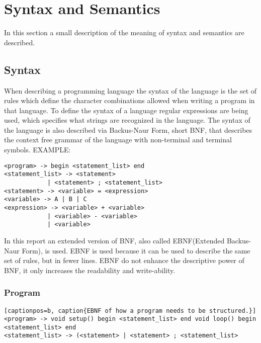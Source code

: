 \chapter{Syntax and Semantics}\label{analysis:syntax-and-semantics}
In this section a small description of the meaning of syntax and semantics are described.

\section{Syntax}
When describing a programming language the syntax of the language is the set of rules which define the character combinations allowed when writing a program in that language. To define the syntax of a language regular expressions are being used, which specifies what strings are recognized in the language. The syntax of the language is also described via Backus-Naur Form, short BNF, that describes the context free grammar of the language with non-terminal and terminal symbols.
EXAMPLE: \\
\begin{lstlisting}
<program> -> begin <statement_list> end
<statement_list> -> <statement>
			| <statement> ; <statement_list>
<statement> -> <variable> = <expression>
<variable> -> A | B | C
<expression> -> <variable> + <variable>
			| <variable> - <variable>
			| <variable>
\end{lstlisting}

In this report an extended version of BNF, also called EBNF(Extended Backus-Naur Form), is used. EBNF is used because it can be used to describe the same set of rules, but in fewer lines. EBNF do not enhance the descriptive power of BNF, it only increases the readability and write-ability.

\subsection{Program}
\begin{lstlisting}[captionpos=b, caption{EBNF of how a program needs to be structured.}]
<program> -> void setup() begin <statement_list> end void loop() begin <statement_list> end
<statement_list> -> (<statement> | <statement> ; <statement_list>
\end{lstlisting}

